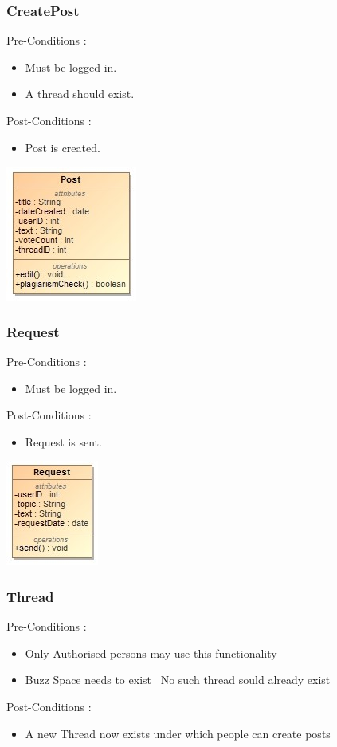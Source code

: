 \documentclass[12pt, oneside]{article}
\begin{document}
			\subsubsection{CreatePost}
				Pre-Conditions : \begin{itemize}
							\item Must be logged in.
							\item A thread should exist.
						     \end{itemize}
				Post-Conditions : \begin{itemize}
							\item Post is created.
						     \end{itemize}
   				 \includegraphics[scale=1]{CreatePost}
			\subsubsection{Request}
				Pre-Conditions : \begin{itemize}
							\item Must be logged in.
						     \end{itemize}
				Post-Conditions : \begin{itemize}
							\item Request is sent.
						     \end{itemize}
   				 \includegraphics[scale=1]{Request}
			\subsubsection{Thread}
				Pre-Conditions : \begin{itemize}
							\item Only Authorised persons may use this functionality
							\item Buzz Space needs to exist 
							\ No such thread sould already exist
						     \end{itemize}
				Post-Conditions : \begin{itemize}
							\item A new Thread now exists under which people can create posts
						     \end{itemize}
\end{document}
